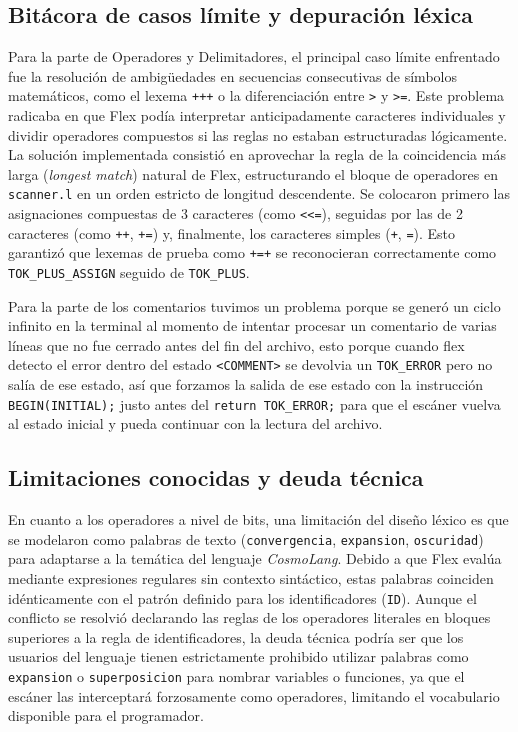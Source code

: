 \documentclass[12pt, letterpaper]{article}
\begin{document}
\subsection*{Bitácora de casos límite y depuración léxica}

\noindent Para la parte de Operadores y Delimitadores, el principal caso límite enfrentado fue la resolución de ambigüedades en secuencias consecutivas de símbolos matemáticos, como el lexema \texttt{+++} o la diferenciación entre \verb|>| y \verb|>=|. Este problema radicaba en que Flex podía interpretar anticipadamente caracteres individuales y dividir operadores compuestos si las reglas no estaban estructuradas lógicamente. La solución implementada consistió en aprovechar la regla de la coincidencia más larga (\textit{longest match}) natural de Flex, estructurando el bloque de operadores en \texttt{scanner.l} en un orden estricto de longitud descendente. Se colocaron primero las asignaciones compuestas de 3 caracteres (como \verb|<<=|), seguidas por las de 2 caracteres (como \texttt{++}, \texttt{+=}) y, finalmente, los caracteres simples (\texttt{+}, \texttt{=}). Esto garantizó que lexemas de prueba como \texttt{+=+} se reconocieran correctamente como \texttt{TOK\_PLUS\_ASSIGN} seguido de \texttt{TOK\_PLUS}.

\noindent Para la parte de los comentarios tuvimos un problema porque se generó un ciclo infinito en la terminal al momento de intentar procesar un comentario de varias líneas que no fue cerrado antes del fin del archivo, esto porque cuando flex detecto el error dentro del estado \texttt{<COMMENT>} se devolvia un \texttt{TOK\_ERROR} pero no salía de ese estado, así que forzamos la salida de ese estado con la instrucción \texttt{BEGIN(INITIAL);} justo antes del \texttt{return TOK\_ERROR;} para que el escáner vuelva al estado inicial y pueda continuar con la lectura del archivo.

\subsection*{Limitaciones conocidas y deuda técnica}

\noindent En cuanto a los operadores a nivel de bits, una limitación del diseño léxico es que se modelaron como palabras de texto (\texttt{convergencia}, \texttt{expansion}, \texttt{oscuridad}) para adaptarse a la temática del lenguaje \textit{CosmoLang}. Debido a que Flex evalúa mediante expresiones regulares sin contexto sintáctico, estas palabras coinciden idénticamente con el patrón definido para los identificadores (\texttt{ID}). Aunque el conflicto se resolvió declarando las reglas de los operadores literales en bloques superiores a la regla de identificadores, la deuda técnica podría ser que los usuarios del lenguaje tienen estrictamente prohibido utilizar palabras como \texttt{expansion} o \texttt{superposicion} para nombrar variables o funciones, ya que el escáner las interceptará forzosamente como operadores, limitando el vocabulario disponible para el programador.
\end{document}
